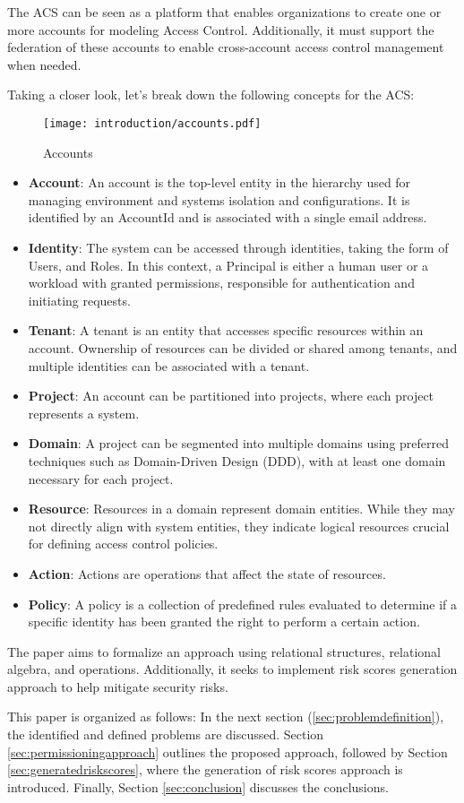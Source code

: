 The ACS can be seen as a platform that enables organizations to create one or more accounts for modeling Access Control. Additionally, it must support the federation of these accounts to enable cross-account access control management when needed.

Taking a closer look, let's break down the following concepts for the ACS:

\begin{figure}[ht]
    \centering
    \texttt{[image: introduction/accounts.pdf]}
    \caption{Accounts}
    \label{fig:accounts}
\end{figure}

\begin{itemize}
    \item \textbf{Account}: An account is the top-level entity in the hierarchy used for managing environment and systems isolation and configurations. It is identified by an AccountId and is associated with a single email address.
    \item \textbf{Identity}: The system can be accessed through identities, taking the form of Users, and Roles. In this context, a Principal is either a human user or a workload with granted permissions, responsible for authentication and initiating requests.
    \item \textbf{Tenant}: A tenant is an entity that accesses specific resources within an account. Ownership of resources can be divided or shared among tenants, and multiple identities can be associated with a tenant.
    \item \textbf{Project}: An account can be partitioned into projects, where each project represents a system.
    \item \textbf{Domain}: A project can be segmented into multiple domains using preferred techniques such as Domain-Driven Design (DDD), with at least one domain necessary for each project.
    \item \textbf{Resource}: Resources in a domain represent domain entities. While they may not directly align with system entities, they indicate logical resources crucial for defining access control policies.
    \item \textbf{Action}: Actions are operations that affect the state of resources.
    \item \textbf{Policy}: A policy is a collection of predefined rules evaluated to determine if a specific identity has been granted the right to perform a certain action.
\end{itemize}

The paper aims to formalize an approach using relational structures, relational algebra, and operations. Additionally, it seeks to implement risk scores generation approach to help mitigate security risks.

This paper is organized as follows: In the next section (\ref{sec:problemdefinition}), the identified and defined problems are discussed. Section \ref{sec:permissioningapproach} outlines the proposed approach, followed by Section \ref{sec:generatedriskscores}, where the generation of risk scores approach is introduced. Finally, Section \ref{sec:conclusion} discusses the conclusions.
